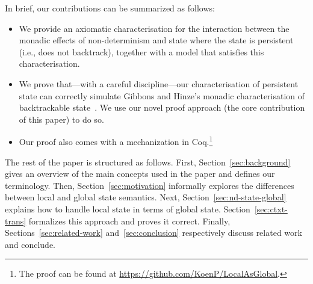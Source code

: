 \documentclass{llncs}
\begin{document}
In brief, our contributions can be summarized as follows:
\begin{itemize}
\item
  We provide an axiomatic characterisation for the interaction between the
  monadic effects of non-determinism and state where the state is persistent
  (i.e., does not backtrack), together with a model that satisfies this
  characterisation.                                                           
\item
  We prove that---with a careful discipline---our characterisation of
  persistent state can correctly simulate Gibbons and Hinze's
  monadic characterisation of backtrackable state~\cite{GibbonsHinze:11:Just}.
  We use our novel proof approach (the core contribution of this paper) to do so.
\item
  Our proof also comes with a mechanization in Coq.\footnote{The proof can be
    found at \url{https://github.com/KoenP/LocalAsGlobal}.}
\end{itemize}

The rest of the paper is structured as follows.
First, Section~\ref{sec:background} gives an overview of the main concepts
  used in the paper and defines our terminology. Then,
Section~\ref{sec:motivation} informally explores the differences
  between local and global state semantics. Next,
Section~\ref{sec:nd-state-global}  explains how to handle local state
in terms of global state.
Section~\ref{sec:ctxt-trans} formalizes this approach and proves it correct.
Finally, Sections~\ref{sec:related-work} and~\ref{sec:conclusion} respectively
discuss related work and conclude.

\end{document}
